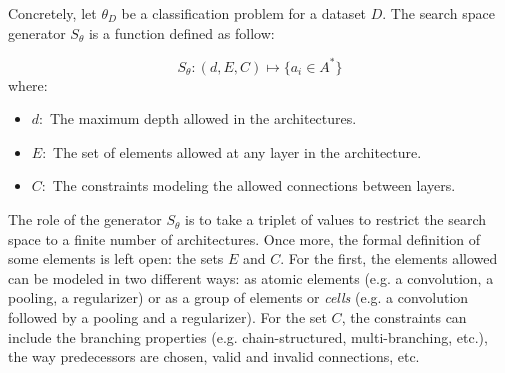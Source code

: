 Concretely, let $\theta_{D}$ be a classification problem for a dataset $D$. The search space generator $S_{\theta}$ is a function defined as follow:



\begin{equation}\label{eq:search_space}
S_\theta: (d, E, C) \mapsto \{a_i \in A^*\}
\end{equation}
where:

\begin{itemize}
    \item[] $d:$ The maximum depth allowed in the architectures.
    \item[] $E:$ The set of elements allowed at any layer in the architecture.
    \item[] $C:$ The constraints modeling the allowed connections between layers.
\end{itemize}

The role of the generator $S_{\theta}$ is to take a triplet of values to restrict the search space to a finite number of architectures. Once more, the formal definition of some elements is left open: the sets $E$ and $C$. For the first, the elements allowed can be modeled in two different ways: as atomic elements (e.g. a convolution, a pooling, a regularizer) or as a group of elements or \textit{cells} (e.g. a convolution followed by a pooling and a regularizer). For the set $C$, the constraints can include the branching properties (e.g. chain-structured, multi-branching, etc.), the way predecessors are chosen, valid and invalid connections, etc.

